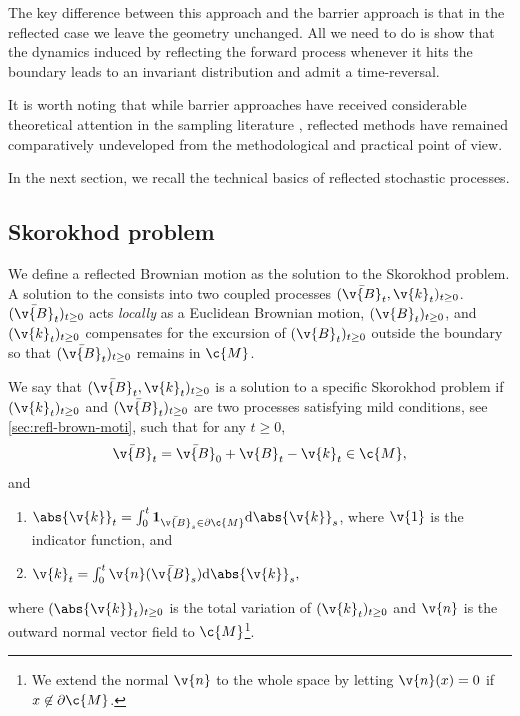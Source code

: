 The key difference between this approach and the barrier approach is that in the reflected case we leave the geometry unchanged.
All we need to do is show that the dynamics induced by reflecting the forward process whenever it hits the boundary leads to an invariant distribution and admit a time-reversal.

It is worth noting that while barrier approaches have received considerable theoretical attention in the sampling literature \parencite{lee2017Geodesic, noble2022Barrier}, reflected methods have remained comparatively undeveloped from the methodological and practical point of view.

In the next section, we recall the technical basics of reflected stochastic processes.

\subsection{Skorokhod problem}
We define a reflected Brownian motion as the solution to the Skorokhod problem.
A solution to the   \parencite{skorokhod1961stochastic} consists into two coupled processes \((\bar{ \v{B}}_t, \v{k}_t)_{t \geq 0}\). \((\bar{ \v{B}}_t)_{t \geq 0}\) acts \emph{locally} as a Euclidean Brownian motion, \(( \v{B}_t)_{t \geq 0}\), and \( (\v{k}_t)_{t \geq 0}\) compensates for the excursion of \(( \v{B}_t)_{t \geq 0}\) outside the boundary so that \((\bar{ \v{B}}_t)_{t \geq 0}\) remains in \(\c{M}\).

We say that \((\bar{ \v{B}}_t, \v{k}_t)_{t \geq 0}\) is a solution to a specific {Skorokhod problem} if \(( \v{k}_t)_{t \geq 0}\) and \((\bar{ \v{B}}_t)_{t \geq 0}\) are two processes satisfying mild conditions, see \cref{sec:refl-brown-moti}, such that for any \(t \geq 0\), \begin{equation} \label{eq:rbm} \bar{ \v{B}}_t = \bar{ \v{B}}_0 + \v{B}_t - \v{k}_t \in \c{M}, \end{equation} and 
\begin{enumerate}
	\item \({\abs{ \v{k}}_t = \int_0^t \mathbf{1}_{\bar{ \v{B}}_s \in \partial \c{M}} \mathrm{d} \abs{ \v{k}}_s}\), where \(\v{1}\) is the indicator function, and
	\item \({ \v{k}_t = \int_0^t \v{n}(\bar{ \v{B}}_s) \mathrm{d} \abs{ \v{k}}_s ,}\)
\end{enumerate} where \((\abs{ \v{k}}_t)_{t \geq 0}\) is the total variation of \(( \v{k}_t)_{t \geq 0}\) and \( \v{n}\) is the outward normal vector field to \(\c{M}\)\footnote{We extend the normal \( \v{n}\) to the whole space by letting \( \v{n}(x)=0\) if \(x \not \in \partial \c{M}\).
}.

